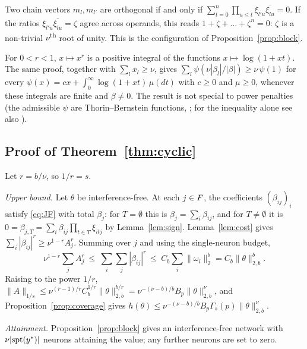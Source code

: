 \begin{remark}
Two chain vectors $m_l,m_{l'}$ are orthogonal if and only if $\sum_{t=0}^n\prod_{u\le t}\xi_{l'u}\overline{\xi_{lu}}=0$. If the ratios $\xi_{l'u}\overline{\xi_{lu}}=\zeta$ agree across operands, this reads $1+\zeta+\dots+\zeta^n=0$: $\zeta$ is a non-trivial $\nu$\textsuperscript{th} root of unity. This is the configuration of Proposition~\ref{prop:block}.
\end{remark}

\begin{remark}
For $0<r<1$, $x\mapsto x^r$ is a positive integral of the functions $x\mapsto\log(1+xt)$. The same proof, together with $\sum_lx_l\ge\nu$, gives $\sum_l\psi(\nu|\beta_l|/|\beta|)\ge\nu\,\psi(1)$ for every $\psi(x)=cx+\int_0^\infty\log(1+xt)\,\mu(dt)$ with $c\ge0$ and $\mu\ge0$, whenever these integrals are finite and $\beta\neq0$. The result is not special to power penalties (the admissible $\psi$ are Thorin--Bernstein functions, \citealp[Ch.~8]{schilling2012bernstein}; for the inequality alone see also \citealp{thompson1976convex}).
\end{remark}

\subsection{Proof of Theorem~\ref{thm:cyclic}}\label{app:thm}

Let $r=b/\nu$, so $1/r=s$.

\emph{Upper bound.} Let $\theta$ be interference-free. At each $j\in F$, the coefficients $(\beta_{ij})_i$ satisfy \eqref{eq:JF} with total $\beta_j$: for $T=\emptyset$ this is $\beta_j=\sum_i\beta_{ij}$, and for $T\neq\emptyset$ it is $0=\beta_{j,T}=\sum_i\beta_{ij}\prod_{t\in T}\xi_{itj}$ by Lemma~\ref{lem:sign}. Lemma~\ref{lem:cost} gives $\sum_i|\beta_{ij}|^r\ge\nu^{1-r}A_j^r$. Summing over $j$ and using the single-neuron budget,
\begin{equation}
\nu^{1-r}\sum_jA_j^r\ \le\ \sum_i\sum_j|\beta_{ij}|^r\ \le\ C_b\sum_i\|\omega_i\|_2^b=C_b\|\theta\|_{2,b}^b .
\label{eq:chain}
\end{equation}
Raising to the power $1/r$, $\|A\|_{1/s}\le\nu^{(r-1)/r}C_b^{1/r}\|\theta\|_{2,b}^{b/r}=\nu^{-(\nu-b)/b}B_p\|\theta\|_{2,b}^{\nu}$, and Proposition~\ref{prop:coverage} gives $h(\theta)\le\nu^{-(\nu-b)/b}B_p\Gamma_s(p)\|\theta\|_{2,b}^\nu$.

\emph{Attainment.} Proposition~\ref{prop:block} gives an interference-free network with $\nu|\mathrm{spt}(y^*)|$ neurons attaining the value; any further neurons are set to zero.

